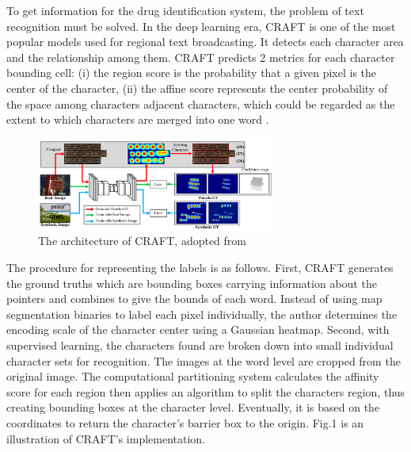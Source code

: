 To get information for the drug identification system, the problem of text recognition must be solved. In the deep learning era, CRAFT is one of the most popular models used for regional text broadcasting. It detects each character area and the relationship among them. CRAFT predicts 2 metrics for each character bounding cell: (i) the region score is the probability that a given pixel is the center of the character, (ii) the affine score represents the center probability of the space among characters adjacent characters, which could be regarded as the extent to which characters are merged into one word \cite{baek2019character}. 
\begin{figure}
\centering
\includegraphics[width=0.7\textwidth]{background/CRAFT.png}
\caption{The architecture of CRAFT, adopted from \cite{baek2019character}}\label{fig_craft}
\end{figure}
The procedure for representing the labels is as follows. First, CRAFT generates the ground truths which are bounding boxes carrying information about the pointers and combines to give the bounds of each word. Instead of using map segmentation binaries to label each pixel individually, the author determines the encoding scale of the character center using a Gaussian heatmap. Second, with supervised learning, the characters found are broken down into small individual character sets for recognition. The images at the word level are cropped from the original image. The computational partitioning system calculates the affinity score for each region then applies an algorithm to split the characters region, thus creating bounding boxes at the character level. Eventually, it is based on the coordinates to return the character's barrier box to the origin.  Fig.1 is an illustration of CRAFT's implementation.



